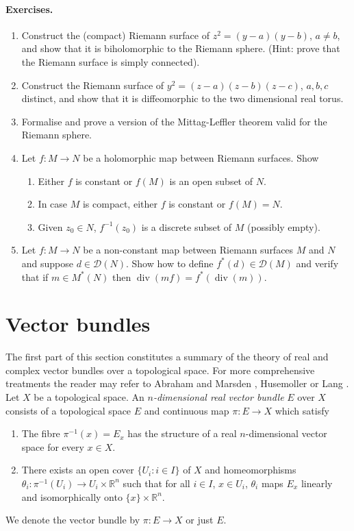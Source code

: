 \paragraph*{Exercises.}
\begin{enumerate}
\item Construct the (compact) Riemann surface of $z^2=(y-a)(y-b)$, $a\ne b$, and show that it is biholomorphic to the Riemann sphere. (Hint: prove that the Riemann surface is simply connected).
\item Construct the Riemann surface of $y^2=(z-a)(z-b)(z-c)$, $a,b,c$ distinct, and show that it is diffeomorphic to the two dimensional real torus.
\item Formalise and prove a version of the Mittag-Leffler theorem valid for the Riemann sphere.
\item Let $f:M\to N$ be a holomorphic map between Riemann surfaces. Show
\begin{enumerate}
\item[(a)] Either $f$ is constant or $f(M)$ is an open subset of $N$.
\item[(b)] In case $M$ is compact, either $f$ is constant or $f(M)=N$.
\item[(c)] Given $z_0\in N$, $f^{-1}(z_0)$ is a discrete subset of $M$ (possibly empty).
\end{enumerate}
\item Let $f:M\to N$ be a non-constant map between Riemann surfaces $M$ and $N$ and suppose $d\in\mathcal D(N)$. Show how to define $f^*(d)\in\mathcal D(M)$ and verify that if $m\in M^*(N)$ then $\operatorname{div}(mf)=f^*(\operatorname{div}(m))$.
\end{enumerate}

\section{Vector bundles}\label{sec:1:5}
The first part of this section constitutes a summary of the theory of real and complex vector bundles over a topological space. For more comprehensive treatments the reader may refer to Abraham and Marsden \cite{bib:I:abraham-r-and-marsden-j-e:1}, Husemoller \cite{bib:I:husmoller-d:1} or Lang \cite{bib:I:lang-s:1}.
 Let $X$ be a topological space. An \emph{$n$-dimensional real vector bundle} $E$ over $X$ consists of a topological space $E$ and continuous map $\pi:E\to X$ which satisfy
\begin{enumerate}
\item[(a)] The fibre $\pi^{-1}(x)=E_x$ has the structure of a real $n$-dimensional vector space for every $x\in X$.
\item[(b)] There exists an open cover $\{U_i:i\in I\}$ of $X$ and homeomorphisms $\theta_i:\pi^{-1}(U_i)\to U_i\times\mathbb R^n$ such that for all $i\in I$, $x\in U_i$, $\theta_i$ maps $E_x$ linearly and isomorphically onto $\{x\}\times\mathbb R^n$.
\end{enumerate}
We denote the vector bundle by $\pi:E\to X$ or just $E$.

